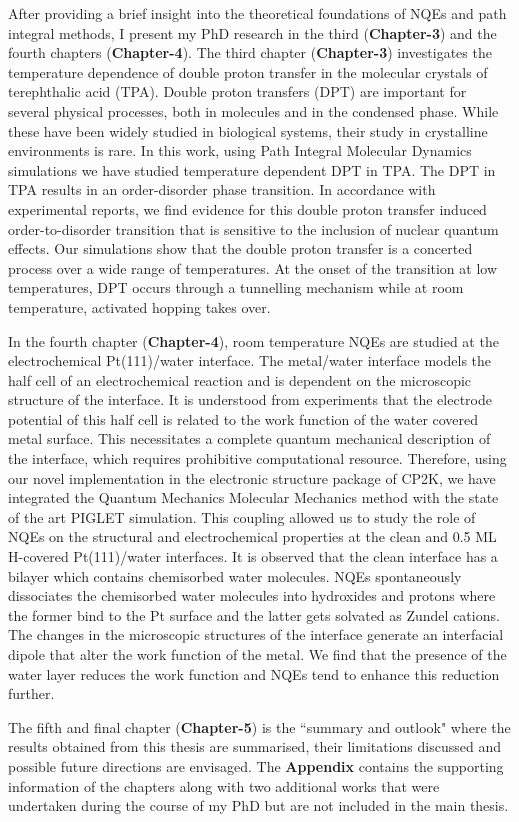 \noindent After providing a brief insight into the theoretical foundations of NQEs and path integral methods, I present my PhD research in the third (\textbf{Chapter-3}) and the fourth chapters (\textbf{Chapter-4}). The third chapter (\textbf{Chapter-3}) investigates the temperature dependence of double proton transfer in the molecular crystals of terephthalic acid (TPA). Double proton transfers (DPT) are important for several physical processes, both in molecules and in the condensed phase. While these have been widely studied in biological systems, their study in crystalline environments is rare. In this work, using Path Integral Molecular Dynamics simulations we have studied temperature dependent DPT in TPA. The DPT in TPA results in an order-disorder phase transition. In accordance with experimental reports, we find evidence for this double proton transfer induced order-to-disorder transition that is sensitive to the inclusion of nuclear quantum effects. Our simulations show that the double proton transfer is a concerted process over a wide range of temperatures. At the onset of the transition at low temperatures, DPT occurs through a tunnelling mechanism while at room temperature, activated hopping takes over.

\noindent In the fourth chapter (\textbf{Chapter-4}), room temperature NQEs are studied at the electrochemical Pt(111)/water interface. The metal/water interface models the half cell of an electrochemical reaction and is dependent on the microscopic structure of the interface. It is understood from experiments that the electrode potential of this half cell is related to the work function of the water covered metal surface. This necessitates a complete quantum mechanical description of the interface, which requires prohibitive computational resource. Therefore, using our novel implementation in the electronic structure package of CP2K, we have integrated the Quantum Mechanics Molecular Mechanics method with the state of the art PIGLET simulation. This coupling allowed us to study the role of NQEs on the structural and electrochemical properties at the clean and 0.5 ML H-covered Pt(111)/water interfaces. It is observed that the clean interface has a bilayer which contains chemisorbed water molecules. NQEs spontaneously dissociates the chemisorbed water molecules into hydroxides and protons where the former bind to the Pt surface and the latter gets solvated as Zundel cations. The changes in the microscopic structures of the interface generate an interfacial dipole that alter the work function of the metal. We find that the presence of the water layer reduces the work function and NQEs tend to enhance this reduction further. 

\noindent The fifth and final chapter (\textbf{Chapter-5}) is the ``summary and outlook" where the results obtained from this thesis are summarised, their limitations discussed and possible future directions are envisaged. The \textbf{Appendix} contains the supporting information of the chapters along with two additional works that were undertaken during the course of my PhD but are not included in the main thesis.




